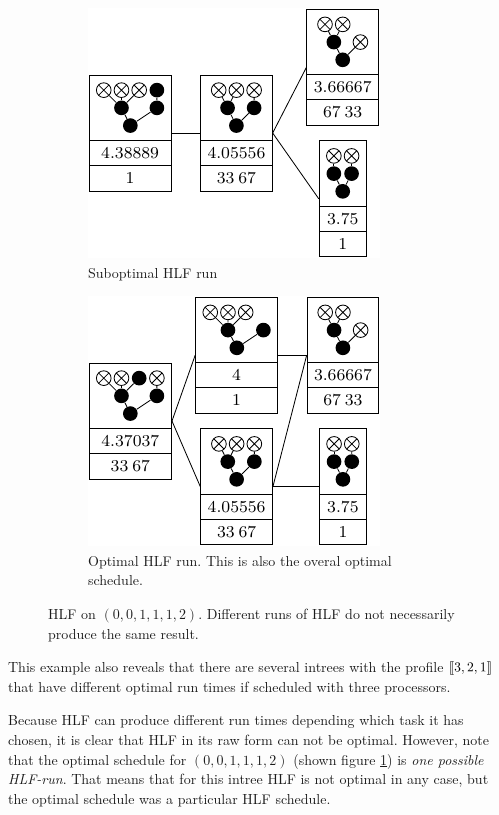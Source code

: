 \begin{figure}[ht]
  \centering
  \begin{subfigure}{.45\linewidth}
    \centering
    \includegraphics{p3/hlf_not_optimal/001112_hlf_subopt.pdf}
    \caption{Suboptimal HLF run}
  \end{subfigure}
  \begin{subfigure}{.45\linewidth}
    \centering
    \includegraphics{p3/hlf_not_optimal/001112_hlf_opt.pdf}
    \caption{Optimal HLF run. This is also the overal optimal schedule.}
    \label{fig:hlf-001112-optimal-version}
  \end{subfigure}
  \caption{HLF on $(0,0,1,1,1,2)$. Different runs of HLF do not necessarily produce the same result.}
  \label{fig:hlf-001112}
\end{figure}

This example also reveals that there are several intrees with the profile $\left\llbracket 3,2,1 \right\rrbracket$ that have different optimal run times if scheduled with three processors.

Because HLF can produce different run times depending which task it has chosen, it is clear that HLF in its raw form can not be optimal. However, note that the optimal schedule for $(0,0,1,1,1,2)$ (shown figure \ref{fig:hlf-001112-optimal-version}) is \emph{one possible HLF-run}. That means that for this intree HLF is not optimal in any case, but the optimal schedule was a particular HLF schedule.

